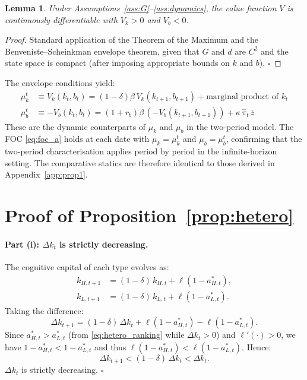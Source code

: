\documentclass[12pt]{article}
\newtheorem{lemma}{Lemma}
\newcommand{\hpi}{\hat{\pi}}
\begin{document}
\begin{lemma}
Under Assumptions~\ref{ass:G}--\ref{ass:dynamics}, the value function $V$ is
continuously differentiable with $V_k > 0$ and $V_b < 0$.
\end{lemma}

\begin{proof}
Standard application of the Theorem of the Maximum and the Benveniste--Scheinkman
envelope theorem, given that $G$ and $d$ are $C^2$ and the state space is compact
(after imposing appropriate bounds on $k$ and $b$). $\square$
\end{proof}

The envelope conditions yield:
\begin{align}
\mu_k^t &\equiv V_k(k_t, b_t) = (1-\delta)\beta\,V_k(k_{t+1}, b_{t+1}) + \text{marginal product of } k_t\\
\mu_b^t &\equiv -V_b(k_t, b_t) = (1+r_b)\beta\,(-V_b(k_{t+1}, b_{t+1})) + \kappa\,\hpi_t\,\bar{z}
\end{align}
These are the dynamic counterparts of $\mu_k$ and $\mu_b$ in the two-period model.
The FOC \eqref{eq:foc_a} holds at each date with $\mu_k = \mu_k^t$ and $\mu_b = \mu_b^t$,
confirming that the two-period characterisation applies period by period in the
infinite-horizon setting. The comparative statics are therefore identical to those
derived in Appendix~\ref{app:prop1}.

\section{Proof of Proposition~\ref{prop:hetero}}
\label{app:prop6}

\paragraph{Part (i): $\Delta k_t$ is strictly decreasing.}

The cognitive capital of each type evolves as:
\begin{align*}
k_{H,t+1} &= (1-\delta)\,k_{H,t} + \ell(1 - a_{H,t}^*),\\
k_{L,t+1} &= (1-\delta)\,k_{L,t} + \ell(1 - a_{L,t}^*).
\end{align*}
Taking the difference:
\[
\Delta k_{t+1} = (1-\delta)\,\Delta k_t + \ell(1-a_{H,t}^*) - \ell(1-a_{L,t}^*).
\]
Since $a_{H,t}^* > a_{L,t}^*$ (from \eqref{eq:hetero_ranking} while $\Delta k_t > 0$)
and $\ell'(\cdot) > 0$, we have $1-a_{H,t}^* < 1-a_{L,t}^*$ and thus
$\ell(1-a_{H,t}^*) < \ell(1-a_{L,t}^*)$.
Hence:
\[
\Delta k_{t+1} < (1-\delta)\,\Delta k_t < \Delta k_t.
\]
$\Delta k_t$ is strictly decreasing. $\square$
\end{document}

